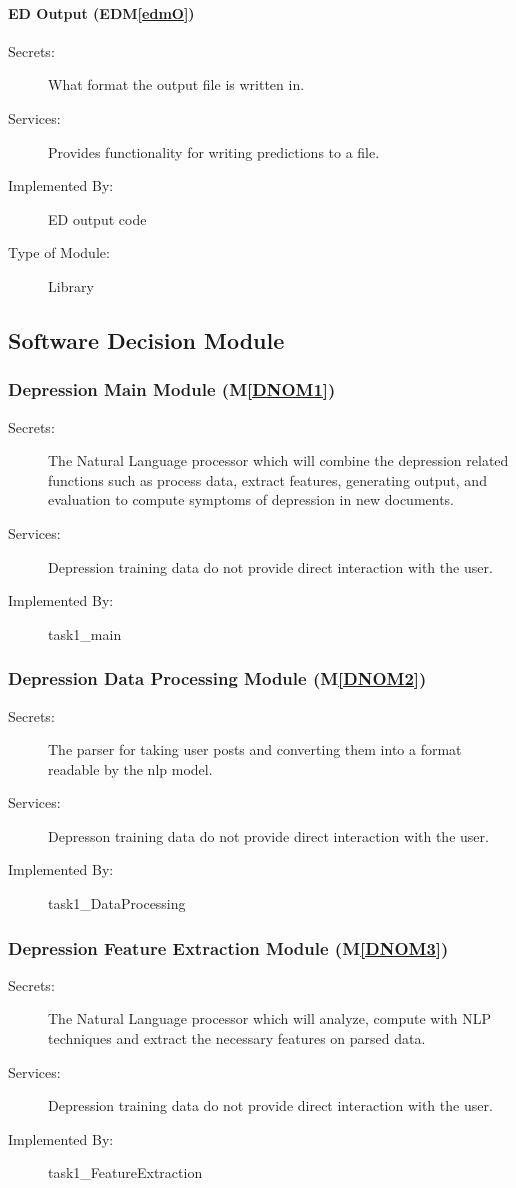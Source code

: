\documentclass[12pt, titlepage]{article}
\newcommand{\mref}[1]{M\ref{#1}}
\newcommand{\edmref}[1]{EDM\ref{#1}}
\begin{document}
\paragraph{ED Output (\edmref{edmO})}
\begin{description}
\item[Secrets:]What format the output file is written in.
\item[Services:] Provides functionality for writing predictions to a file.
\item[Implemented By:] ED output code
\item[Type of Module:] Library
\end{description}

\subsection{Software Decision Module}
\subsubsection{Depression Main Module (\mref{DNOM1})}
\begin{description}
\item[Secrets:]The Natural Language processor which will combine the depression related functions such as process data, extract features, generating output, and evaluation to compute symptoms of depression in new documents.
\item[Services:] Depression training data do not provide direct interaction with the user. 
\item[Implemented By:] task1\_main
\end{description}

\subsubsection{Depression Data Processing Module (\mref{DNOM2})}
\begin{description}
\item[Secrets:]The parser for taking user posts and converting them into a format readable by the nlp model.
\item[Services:] Depresson training data do not provide direct interaction with the user. 
\item[Implemented By:] task1\_DataProcessing
\end{description}

\subsubsection{Depression Feature Extraction Module (\mref{DNOM3})}
\begin{description}
\item[Secrets:]The Natural Language processor which will analyze, compute with NLP techniques and extract the necessary features on parsed data.
\item[Services:] Depression training data do not provide direct interaction with the user. 
\item[Implemented By:] task1\_FeatureExtraction
\end{description}
\end{document}
